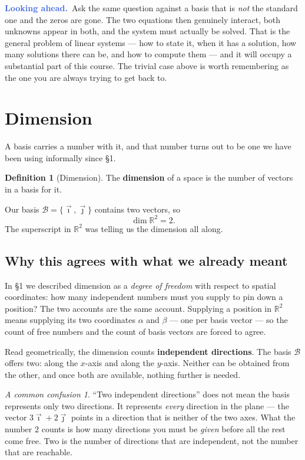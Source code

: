 \documentclass[11pt]{article}
\theoremstyle{definition}
\newtheorem{defn}{Definition}[section]
\theoremstyle{remark}
\newtheorem*{warn}{A common confusion}
\newcommand{\lookahead}{\par\smallskip\noindent
  \textbf{\sffamily\textcolor{RoyalBlue}{Looking ahead.}}\ \ignorespaces}
\newcommand{\R}{\mathbb{R}}
\newcommand{\ivec}{\vec{\imath}}
\newcommand{\jvec}{\vec{\jmath}}
\newcommand{\bas}{\mathcal{B}}
\begin{document}
\lookahead Ask the same question against a basis that is \emph{not} the standard
one and the zeros are gone. The two equations then genuinely interact, both
unknowns appear in both, and the system must actually be solved. That is the
general problem of linear systems --- how to state it, when it has a solution,
how many solutions there can be, and how to compute them --- and it will occupy
a substantial part of this course. The trivial case above is worth remembering
as the one you are always trying to get back to.

\section{Dimension}
A basis carries a number with it, and that number turns out to be one we have
been using informally since \S1.

\begin{defn}[Dimension]
The \textbf{dimension} of a space is the number of vectors in a basis for it.
\end{defn}

\noindent Our basis $\bas=\{\ivec,\jvec\}$ contains two vectors, so
\[
  \dim\R^{2} = 2 .
\]
The superscript in $\R^{2}$ was telling us the dimension all along.

\subsection*{Why this agrees with what we already meant}
In \S1 we described dimension as a \emph{degree of freedom} with respect to
spatial coordinates: how many independent numbers must you supply to pin down a
position? The two accounts are the same account. Supplying a position in
$\R^{2}$ means supplying its two coordinates $\alpha$ and $\beta$ --- one per
basis vector --- so the count of free numbers and the count of basis vectors are
forced to agree.

Read geometrically, the dimension counts \textbf{independent directions}. The
basis $\bas$ offers two: along the $x$-axis and along the $y$-axis. Neither can
be obtained from the other, and once both are available, nothing further is
needed.

\begin{warn}
``Two independent directions'' does not mean the basis represents only two
directions. It represents \emph{every} direction in the plane --- the vector
$3\ivec+2\jvec$ points in a direction that is neither of the two axes. What the
number $2$ counts is how many directions you must be \emph{given} before all the
rest come free. Two is the number of directions that are independent, not the
number that are reachable.
\end{warn}
\end{document}
